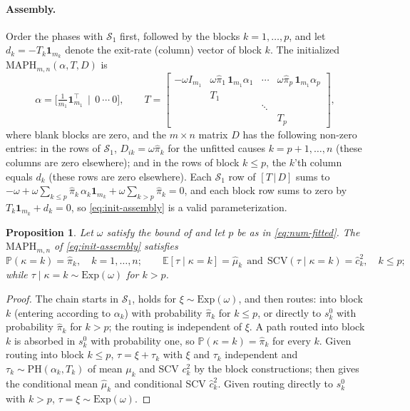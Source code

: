 \documentclass{article}
\newtheorem{proposition}{Proposition}
\newcommand{\Prob}{\mathbb{P}}
\newcommand{\ex}[1]{\mathbb{E}\left[#1\right]}
\newcommand{\cs}{\mathcal{S}}
\begin{document}
\paragraph{Assembly.} Order the phases with $\cs_1$ first, followed by the blocks $k = 1,\ldots,p$, and let $d_k = -T_k \mathbf{1}_{m_k}$ denote the exit-rate (column) vector of block $k$. The initialized $\text{MAPH}_{m,n}(\alpha, T, D)$ is
\begin{equation}
\label{eq:init-assembly}
\alpha = \Big[\tfrac{1}{m_1}\mathbf{1}_{m_1}^\top ~~\Big\vert~~ 0 ~\cdots~ 0\Big],
\qquad
T=\begin{bmatrix}
-\omega I_{m_1} & \omega\hat{\pi}_1\,\mathbf{1}_{m_1}\alpha_1 & \cdots & \omega\hat{\pi}_p\,\mathbf{1}_{m_1}\alpha_p\\
 & T_1 & &\\
 & & \ddots &\\
 & & & T_p
\end{bmatrix},
\end{equation}
where blank blocks are zero, and the $m \times n$ matrix $D$ has the following non-zero entries: in the rows of $\cs_1$, $D_{ik} = \omega\hat{\pi}_k$ for the unfitted causes $k = p+1,\ldots,n$ (these columns are zero elsewhere); and in the rows of block $k \le p$, the $k$'th column equals $d_k$ (these rows are zero elsewhere). Each $\cs_1$ row of $[T \,\vert\, D]$ sums to $-\omega + \omega\sum_{k\le p}\hat{\pi}_k\,\alpha_k\mathbf{1}_{m_k} + \omega\sum_{k>p}\hat{\pi}_k = 0$, and each block row sums to zero by $T_k\mathbf{1}_{m_k} + d_k = 0$, so \eqref{eq:init-assembly} is a valid parameterization.

\begin{proposition}
\label{prop:init-matching}
Let $\omega$ satisfy the bound of  and let $p$ be as in \eqref{eq:num-fitted}. The $\text{MAPH}_{m,n}$ of \eqref{eq:init-assembly} satisfies
\[
\Prob(\kappa = k) = \hat{\pi}_k, \quad k = 1,\ldots,n;
\qquad
\ex{\tau \mid \kappa = k} = \hat{\mu}_k
~~\text{and}~~
\mathrm{SCV}(\tau \mid \kappa = k) = \hat{c}_k^2, \quad k \le p;
\]
while $\tau \mid \kappa = k \sim \mathrm{Exp}(\omega)$ for $k > p$.
\end{proposition}
\begin{proof}
The chain starts in $\cs_1$, holds for $\xi \sim \mathrm{Exp}(\omega)$, and then routes: into block $k$ (entering according to $\alpha_k$) with probability $\hat{\pi}_k$ for $k \le p$, or directly to $s^0_k$ with probability $\hat{\pi}_k$ for $k > p$; the routing is independent of $\xi$. A path routed into block $k$ is absorbed in $s^0_k$ with probability one, so $\Prob(\kappa=k) = \hat{\pi}_k$ for every $k$. Given routing into block $k \le p$, $\tau = \xi + \tau_k$ with $\xi$ and $\tau_k$ independent and $\tau_k \sim \mathrm{PH}(\alpha_k, T_k)$ of mean $\mu_k$ and SCV $c_k^2$ by the block constructions;  then gives the conditional mean $\hat{\mu}_k$ and conditional SCV $\hat{c}_k^2$. Given routing directly to $s^0_k$ with $k > p$, $\tau = \xi \sim \mathrm{Exp}(\omega)$.
\end{proof}
\end{document}
